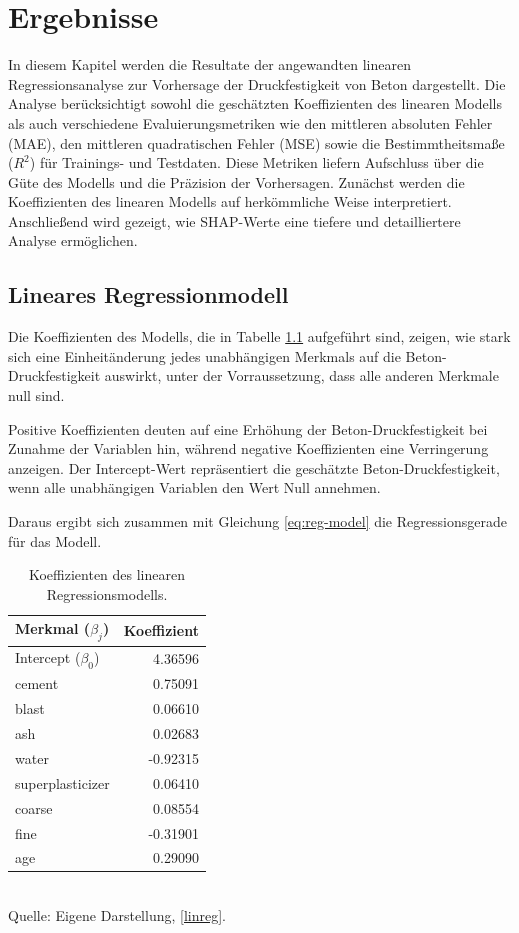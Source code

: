 \chapter{Ergebnisse}
\label{chapter:results}

In diesem Kapitel werden die Resultate der angewandten linearen Regressionsanalyse 
zur Vorhersage der Druckfestigkeit von Beton dargestellt. 
Die Analyse berücksichtigt sowohl die geschätzten Koeffizienten des linearen Modells 
als auch verschiedene Evaluierungsmetriken wie den mittleren absoluten Fehler (MAE), 
den mittleren quadratischen Fehler (MSE) sowie die Bestimmtheitsmaße ($R^2$) 
für Trainings- und Testdaten. Diese Metriken liefern Aufschluss über die Güte des Modells 
und die Präzision der Vorhersagen. Zunächst werden die Koeffizienten 
des linearen Modells auf herkömmliche Weise interpretiert. Anschließend wird gezeigt, 
wie SHAP-Werte eine tiefere und detailliertere Analyse ermöglichen.

\section{Lineares Regressionmodell}

Die Koeffizienten des Modells, die in Tabelle \ref{tab:model-coefficients} 
aufgeführt sind, zeigen, wie stark sich eine Einheitänderung jedes unabhängigen Merkmals 
auf die Beton-Druckfestigkeit auswirkt, unter der Vorraussetzung, dass alle anderen 
Merkmale null sind. 

Positive Koeffizienten deuten auf eine Erhöhung der Beton-Druckfestigkeit 
bei Zunahme der Variablen hin, während negative Koeffizienten eine Verringerung anzeigen. 
Der Intercept-Wert repräsentiert die geschätzte Beton-Druckfestigkeit, 
wenn alle unabhängigen Variablen den Wert Null annehmen. 

Daraus ergibt sich zusammen mit Gleichung \ref{eq:reg-model} die Regressionsgerade für das Modell.

\begin{table}[!h]
    \caption{Koeffizienten des linearen Regressionsmodells.}
    \begin{tabularx}{\textwidth}{Xr}
    \toprule
    Merkmal ($\beta_j$) & Koeffizient \\
    \midrule
    Intercept ($\beta_0$) & 4.36596 \\
    cement & 0.75091 \\
    blast & 0.06610 \\
    ash & 0.02683 \\
    water & -0.92315 \\
    superplasticizer & 0.06410 \\
    coarse & 0.08554 \\
    fine &  -0.31901 \\
    age & 0.29090 \\
    \bottomrule
    \end{tabularx}
    \label{tab:model-coefficients}
    \\ Quelle: Eigene Darstellung, \ref{linreg}.
\end{table}

